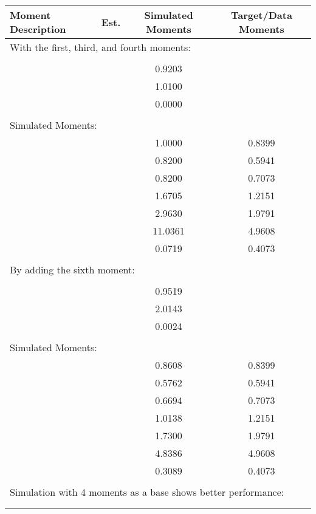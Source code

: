 \begin{tabular}{p{5cm}ccc}
        \toprule
        Moment Description & Est. & Simulated Moments & Target/Data Moments \\
        \midrule
        \multicolumn{4}{l}{With the first, third, and fourth moments:} \\
        & & & \\
        & & 0.9203 & \\
        & & 1.0100 & \\
        & & 0.0000 & \\
        & & & \\
        \multicolumn{4}{l}{Simulated Moments:} \\
        & & 1.0000 & 0.8399 \\
        & & 0.8200 & 0.5941 \\
        & & 0.8200 & 0.7073 \\
        & & 1.6705 & 1.2151 \\
        & & 2.9630 & 1.9791 \\
        & & 11.0361 & 4.9608 \\
        & & 0.0719 & 0.4073 \\
        & & & \\
        \multicolumn{4}{l}{By adding the sixth moment:} \\
        & & & \\ 
        & &  0.9519 & \\
        & &  2.0143 & \\
        & &  0.0024 & \\
        & & & \\
        \multicolumn{4}{l}{Simulated Moments:} \\
        & & 0.8608 & 0.8399 \\
        & & 0.5762 & 0.5941 \\
        & & 0.6694  & 0.7073 \\
        & & 1.0138 & 1.2151 \\
        & & 1.7300  & 1.9791 \\
        & & 4.8386 & 4.9608 \\
        & & 0.3089 & 0.4073 \\
        & & & \\
        \multicolumn{4}{l}{Simulation with 4 moments as a base shows better performance:} \\
        & & & \\
        & & & \\
        \bottomrule
    \end{tabular}
    